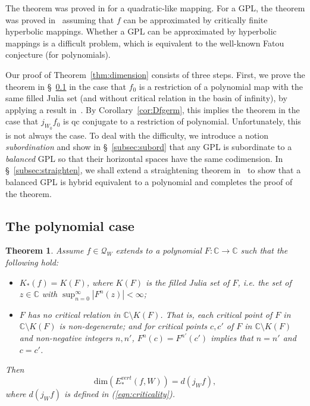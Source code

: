 \documentclass{amsart}
\numberwithin{equation}{section}
\newtheorem{theorem}{Theorem}[section]
\newcommand{\C}{\mathbb C}
\theoremstyle{definition}
\theoremstyle{remark}
\begin{document}
The theorem was proved in \cite{L2} for a quadratic-like mapping.  For a GPL, the theorem was proved in~\cite{Smania} assuming that $f$ can be approximated by critically finite hyperbolic mappings. Whether a GPL can be approximated by hyperbolic mappings is a difficult problem, which is equivalent to the well-known Fatou conjecture (for polynomials).

Our proof of Theorem~\ref{thm:dimension} consists of three steps. First, we prove the theorem in \S~\ref{subsec:poly} in the case that $f_0$ is a restriction of a polynomial map with the same filled Julia set (and without critical relation in the basin of infinity), by applying a result in~\cite{Astorg}. By Corollary~\ref{cor:Dfgerm}, this implies the theorem in the case that $j_{W_0}f_0$ is qc conjugate to a restriction of polynomial. Unfortunately, this is not always the case. To deal with the difficulty, we introduce a notion {\em subordination} and show in \S~\ref{subsec:subord} that any GPL is subordinate to a {\em balanced } GPL so that their horizontal spaces have the same codimension. In \S~\ref{subsec:straighten}, we shall extend a straightening theorem in~\cite{Baranski} to show that a balanced GPL is hybrid equivalent to a polynomial and completes the proof of the theorem. 

\subsection{The polynomial case}\label{subsec:poly}

\begin{theorem}\label{thm:poly} Assume $f\in \mathcal{Q}_W$ extends to a polynomial $F:\mathbb{C}\to\mathbb{C}$ 
such that the following hold:
\begin{itemize}
\item $K_*(f)=K(F)$, where $K(F)$ is the filled Julia set of $F$, i.e. the set of $z\in \C$ with $\sup_{n=0}^\infty |F^n(z)|<\infty$;
\item $F$ has no critical relation in $\mathbb{C}\setminus K(F)$. That is, each critical point of $F$ in $\C\setminus K(F)$ is non-degenerate; and for critical points $c,c'$ of $F$ in $\C\setminus K(F)$ and non-negative integers $n, n'$, $F^n(c)=F^{n'}(c')$ implies that $n=n'$ and $c=c'$. 
\end{itemize}
Then 
$$\text{dim}(E^{vert}_*(f,W))=d(j_Wf),$$
where $d(j_W f)$ is defined in (\ref{eqn:criticality}). 
\end{theorem}
\end{document}
